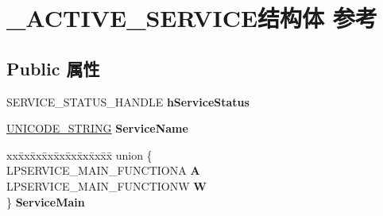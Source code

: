 \hypertarget{struct___a_c_t_i_v_e___s_e_r_v_i_c_e}{}\section{\+\_\+\+A\+C\+T\+I\+V\+E\+\_\+\+S\+E\+R\+V\+I\+C\+E结构体 参考}
\label{struct___a_c_t_i_v_e___s_e_r_v_i_c_e}
\subsection*{Public 属性}
\begin{DoxyCompactItemize}
\item 
\mbox{\label{struct___a_c_t_i_v_e___s_e_r_v_i_c_e_a1d2ac8ac6b67973a0510d4d659f351a0}} 
S\+E\+R\+V\+I\+C\+E\+\_\+\+S\+T\+A\+T\+U\+S\+\_\+\+H\+A\+N\+D\+LE {\bfseries h\+Service\+Status}
\item 
\mbox{\label{struct___a_c_t_i_v_e___s_e_r_v_i_c_e_ae342a8ec5f1a993f062191f3d8b0079a}} 
\hyperlink{struct___u_n_i_c_o_d_e___s_t_r_i_n_g}{U\+N\+I\+C\+O\+D\+E\+\_\+\+S\+T\+R\+I\+NG} {\bfseries Service\+Name}
\item 
\mbox{\label{struct___a_c_t_i_v_e___s_e_r_v_i_c_e_ab186e78fe46023762f905e8c49b78ab0}} 
\begin{tabbing}
xx\=xx\=xx\=xx\=xx\=xx\=xx\=xx\=xx\=\kill
union \{\\
\>LPSERVICE\_MAIN\_FUNCTIONA {\bfseries A}\\
\>LPSERVICE\_MAIN\_FUNCTIONW {\bfseries W}\\
\} {\bfseries ServiceMain}\\


\end{tabbing}
\end{DoxyCompactItemize}
